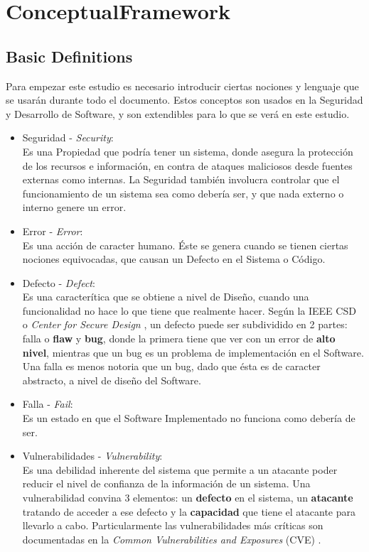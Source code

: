 \chapter{ConceptualFramework}
\label{chap2:FC}


\section{Basic Definitions}
\label{chap2:Def}

Para empezar este estudio es necesario introducir ciertas nociones y lenguaje que se usarán durante todo el documento. Estos conceptos son usados en la Seguridad y Desarrollo de Software, y son extendibles para lo que se verá en este estudio.

\begin{itemize}
    \item Seguridad - \textit{Security}:
        \\Es una Propiedad que podría tener un sistema, donde asegura la protección de los recursos e información, en contra de ataques maliciosos desde fuentes externas como internas. La Seguridad también involucra controlar que el funcionamiento de un sistema sea como debería ser, y que nada externo o interno genere un error.
    \item Error - \textit{Error}:
        \\Es una acción de caracter humano. Éste se genera cuando se tienen ciertas nociones equivocadas, que causan un Defecto en el Sistema o Código.
    \item Defecto  - \textit{Defect}:
        \\Es una caracterítica que se obtiene a nivel de Diseño, cuando una funcionalidad no hace lo que tiene que realmente hacer. Según la IEEE CSD o \textit{Center for Secure Design} \cite{ieeecsd2}, un defecto puede ser subdividido en 2 partes: falla o \textbf{flaw} y \textbf{bug}, donde la primera tiene que ver con un error de \textbf{alto nivel}, mientras que un bug es un problema de implementación en el Software. Una falla es menos notoria que un bug, dado que ésta es de caracter abstracto, a nivel de diseño del Software.
    \item Falla - \textit{Fail}:
        \\Es un estado en que el Software Implementado no funciona como debería de ser.
    \item Vulnerabilidades - \textit{Vulnerability}:
        \\Es una debilidad inherente del sistema que permite a un atacante poder reducir el nivel de confianza de la información de un sistema. Una vulnerabilidad convina 3 elementos: un \textbf{defecto} en el sistema, un \textbf{atacante} tratando de acceder a ese defecto y la \textbf{capacidad} que tiene el atacante para llevarlo a cabo. Particularmente las vulnerabilidades más críticas son documentadas en la \textit{Common Vulnerabilities and Exposures} (CVE) \cite{cve}.

\end{itemize}
